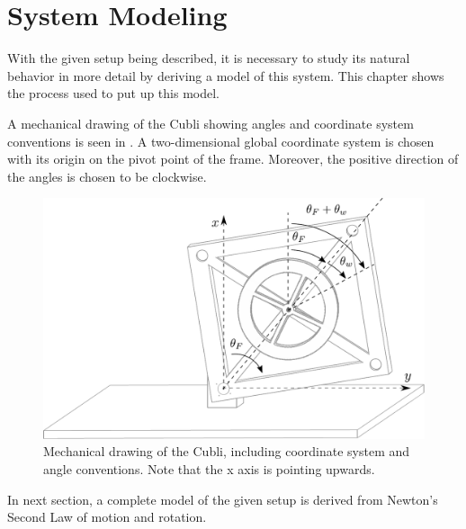 \chapter{System Modeling}
With the given setup being described, it is necessary to study its natural behavior in more detail by deriving a model of this system. This chapter shows the process used to put up this model.

A mechanical drawing of the Cubli showing angles and coordinate system conventions is seen in . A two-dimensional global coordinate system is chosen with its origin on the pivot point of the frame. Moreover, the positive direction of the angles is chosen to be clockwise.

\begin{figure}[H]
 \centering
 \includegraphics[scale=0.6]{figures/mechanicalSystem}
 \caption{Mechanical drawing of the Cubli, including coordinate system and angle conventions. Note that the x axis is pointing upwards.}
 \label{cubliMechanical}
\end{figure}\vspace{-18pt}
%
In next section, a complete model of the given setup is derived from Newton's Second Law of motion and rotation.